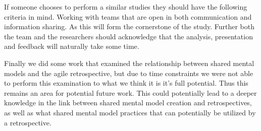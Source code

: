 If someone chooses to perform a similar studies they should have the following criteria in mind. Working with teams that are open in both communication and information sharing. As this will form the cornerstone of the study. Further both the team and the researchers should acknowledge that the analysis, presentation and feedback will naturally take some time.

Finally we did some work that examined the relationship between shared mental models and the agile retrospective, but due to time constraints we were not able to perform this examination to what we think it is it's full potential. Thus this remains an area for potential future work. This could potentially lead to a deeper knowledge in the link between shared mental model creation and retrospectives, as well as what shared mental model practices that can potentially be utilized by a retrospective. 


